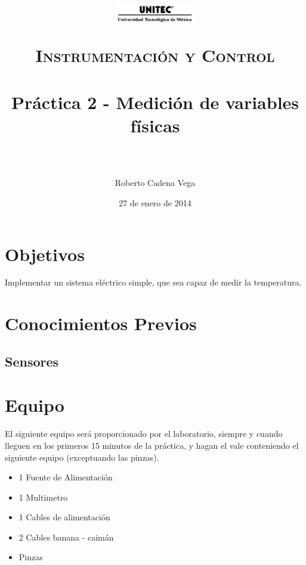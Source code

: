 \documentclass[paper=letter, fontsize=11pt]{scrartcl} %
\title{	
	\normalfont \normalsize
	\begin{figure}[h]
		\begin{center}
			\includegraphics[width=0.3\textwidth]{UNITEC.png} %
		\end{center}
	\end{figure}
	\textsc{Instrumentación y Control} \\ [25pt]
	\horrule{0.5pt} \\[0.4cm] %
	\huge Práctica 2 - Medición de variables físicas \\ %
	\horrule{2pt} \\[0.5cm] %
}
\author{Roberto Cadena Vega} %
\date{\normalsize 27 de enero de 2014} %
\numberwithin{equation}{section} %
\numberwithin{figure}{section} %
\numberwithin{table}{section} %
\begin{document}
\maketitle %


\section{Objetivos}

	Implementar un sistema eléctrico simple, que sea capaz de medir la temperatura.


\section{Conocimientos Previos}


	\subsection{Sensores}

		


\section{Equipo}

	El siguiente equipo será proporcionado por el laboratorio, siempre y cuando lleguen en los primeros 15 minutos de la práctica, y hagan el vale conteniendo el siguiente equipo (exceptuando las pinzas).

	\begin{itemize}
		\item 1 Fuente de Alimentación
		\item 1 Multimetro
		\item 1 Cables de alimentación
		\item 2 Cables banana - caimán
		\item Pinzas
	\end{itemize}
\end{document}
